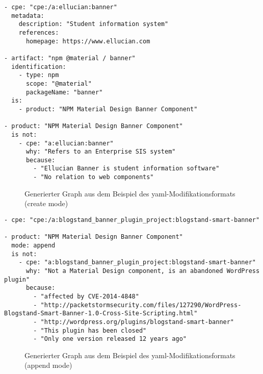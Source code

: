 \begin{lstlisting}[style=yaml,caption={Beispiel des \acrshort{yaml}-Modifikationsformats (create mode)},label={lst:modell-graph-modification-yaml-demo},basicstyle=\ttfamily\scriptsize]
- cpe: "cpe:/a:ellucian:banner"
  metadata:
    description: "Student information system"
    references:
      homepage: https://www.ellucian.com

- artifact: "npm @material / banner"
  identification:
    - type: npm
      scope: "@material"
      packageName: "banner"
  is:
    - product: "NPM Material Design Banner Component"

- product: "NPM Material Design Banner Component"
  is not:
    - cpe: "a:ellucian:banner"
      why: "Refers to an Enterprise SIS system"
      because:
        - "Ellucian Banner is student information software"
        - "No relation to web components"
\end{lstlisting}

\begin{figure}[htbp]
    \centering
    \makebox[\textwidth]{}
    \caption{Generierter Graph aus dem Beispiel des \acrshort{yaml}-Modifikationsformats (create mode)}
    \label{fig:modell-graph-modification-yaml-demo-rendered}
\end{figure}

\begin{lstlisting}[style=yaml,caption={Beispiel des \acrshort{yaml}-Modifikationsformats (append mode)},label={lst:modell-graph-modification-yaml-demo-append},basicstyle=\ttfamily\scriptsize]
- cpe: "cpe:/a:blogstand_banner_plugin_project:blogstand-smart-banner"

- product: "NPM Material Design Banner Component"
  mode: append
  is not:
    - cpe: "a:blogstand_banner_plugin_project:blogstand-smart-banner"
      why: "Not a Material Design component, is an abandoned WordPress plugin"
      because:
        - "affected by CVE-2014-4848"
        - "http://packetstormsecurity.com/files/127290/WordPress-Blogstand-Smart-Banner-1.0-Cross-Site-Scripting.html"
        - "http://wordpress.org/plugins/blogstand-smart-banner"
        - "This plugin has been closed"
        - "Only one version released 12 years ago"
\end{lstlisting}

\begin{figure}[htbp]
    \centering
    \makebox[\textwidth]{}
    \caption{Generierter Graph aus dem Beispiel des \acrshort{yaml}-Modifikationsformats (append mode)}
    \label{fig:modell-graph-modification-yaml-demo-append-rendered}
\end{figure}

